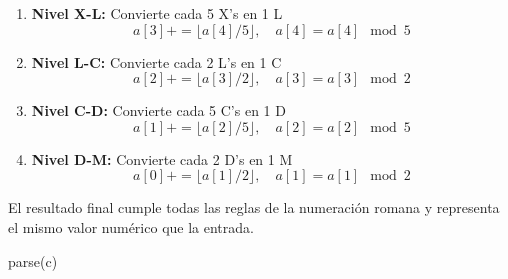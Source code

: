 \documentclass[12pt]{article}
\begin{document}
\begin{itemize}
\begin{enumerate}
        \item \textbf{Nivel X-L:} Convierte cada 5 X's en 1 L
            \[
            a[3] += \lfloor a[4] / 5 \rfloor, \quad a[4] = a[4] \mod 5
            \]

        \item \textbf{Nivel L-C:} Convierte cada 2 L's en 1 C
            \[
            a[2] += \lfloor a[3] / 2 \rfloor, \quad a[3] = a[3] \mod 2
            \]

        \item \textbf{Nivel C-D:} Convierte cada 5 C's en 1 D
            \[
            a[1] += \lfloor a[2] / 5 \rfloor, \quad a[2] = a[2] \mod 5
            \]

        \item \textbf{Nivel D-M:} Convierte cada 2 D's en 1 M
            \[
            a[0] += \lfloor a[1] / 2 \rfloor, \quad a[1] = a[1] \mod 2
            \]
    \end{enumerate}
    El resultado final cumple todas las reglas de la numeración romana y representa el mismo valor numérico que la entrada.

\begin{algorithm}[H]
\caption{parse(c)}

\SetAlgoLined
{}
\end{algorithm}
\end{itemize}
\end{document}
